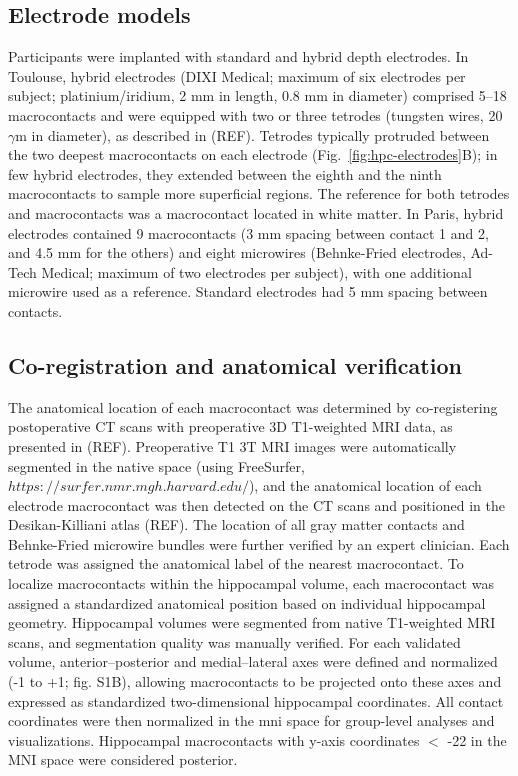 \documentclass[12pt,a4paper]{report}
\newcommand{\g}[1]{\gls{#1}}     %
\begin{document}

\subsection{Electrode models}
Participants were implanted with standard and hybrid depth electrodes. In Toulouse, hybrid electrodes (DIXI Medical; maximum of six electrodes per subject; platinium/iridium, 2 mm in length, 0.8 mm in diameter) comprised 5–18 macrocontacts and were equipped with two or three tetrodes (tungsten wires, 20 $\gamma$m in diameter), as described in (REF). Tetrodes typically protruded between the two deepest macrocontacts on each electrode (Fig.~\ref{fig:hpc-electrodes}B); in few hybrid electrodes, they extended between the eighth and the ninth macrocontacts to sample more superficial regions. The reference for both tetrodes and macrocontacts was a macrocontact located in white matter. In Paris, hybrid electrodes contained 9 macrocontacts (3 mm spacing between contact 1 and 2, and 4.5 mm for the others) and eight microwires (Behnke-Fried electrodes, Ad-Tech Medical; maximum of two electrodes per subject), with one additional microwire used as a reference. Standard electrodes had 5 mm spacing between contacts. 

\subsection{Co-registration and anatomical verification}
The anatomical location of each macrocontact was determined by co-registering postoperative CT scans with preoperative 3D T1-weighted MRI data, as presented in (REF). Preoperative T1 3T MRI images were automatically segmented in the native space (using FreeSurfer, $https://surfer.nmr.mgh.harvard.edu/$), and the anatomical location of each electrode macrocontact was then detected on the CT scans and positioned in the Desikan-Killiani atlas (REF). The location of all gray matter contacts and Behnke-Fried microwire bundles were further verified by an expert clinician. Each tetrode was assigned the anatomical label of the nearest macrocontact. To localize macrocontacts within the hippocampal volume, each macrocontact was assigned a standardized anatomical position based on individual hippocampal geometry. Hippocampal volumes were segmented from native T1-weighted MRI scans, and segmentation quality was manually verified. For each validated volume, anterior–posterior and medial–lateral axes were defined and normalized (-1 to +1; fig. S1B), allowing macrocontacts to be projected onto these axes and expressed as standardized two-dimensional hippocampal coordinates. All contact coordinates were then normalized in the \g{mni} space for group-level analyses and visualizations. Hippocampal macrocontacts with y-axis coordinates $<$ -22 in the MNI space were considered posterior.
\end{document}
